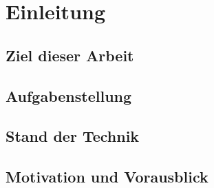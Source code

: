 \chapter{Einleitung}

\section{Ziel dieser Arbeit}
\section{Aufgabenstellung}
\section{Stand der Technik}
\section{Motivation und Vorausblick}
